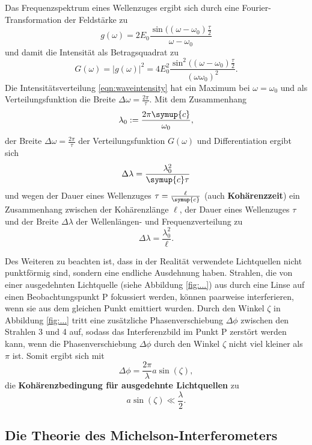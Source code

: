 Das Frequenzspektrum eines Wellenzuges ergibt sich durch eine Fourier-Transformation der 
Feldstärke zu 
\begin{equation}
	g(\omega) = 2E_0 \frac{\sin((\omega-\omega_0)\frac{\tau}{2}}{\omega-\omega_0}
\end{equation}
und damit die Intensität als Betragsquadrat zu
\begin{equation}
	\label{eqn:waveintensity}
	G(\omega) = |g(\omega)|^2 = 4E_0^2 \frac{\sin^2((\omega-\omega_0)\frac{\tau}{2}}{(\omega \omega_0)^2} \mathrm{.}
\end{equation}
Die Intensitätsverteilung \eqref{eqn:waveintensity} hat ein Maximum bei $\omega=\omega_0$ und 
als Verteilungsfunktion die Breite $\Delta \omega = \frac{2\pi}{\tau}$.
Mit dem Zusammenhang 
\begin{equation}
	\lambda_0 := \frac{2\pi \symup{c}}{\omega_0} \mathrm{,}
\end{equation}
der Breite $\Delta \omega = \frac{2\pi}{\tau}$ der Verteilungsfunktion $G(\omega)$ und 
Differentiation ergibt sich
\begin{equation}
	\Delta \lambda = \frac{\lambda_0^2}{\symup{c}\tau}
\end{equation}
und wegen der Dauer eines Wellenzuges $\tau = \frac{\ell}{\symup{c}}$ 
(auch \textbf{Kohärenzzeit}) ein Zusammenhang zwischen der Kohärenzlänge $\ell$, der Dauer
eines Wellenzuges $\tau$ und der Breite $\Delta \lambda$ der Wellenlängen- und Frequenzverteilung zu 
\begin{equation}
	\Delta \lambda = \frac{\lambda_0^2}{\ell} \mathrm{.}
\end{equation}

Des Weiteren zu beachten ist, dass in der Realität verwendete Lichtquellen nicht punktförmig 
sind, sondern eine endliche Ausdehnung haben. Strahlen, die von einer ausgedehnten Lichtquelle 
(siehe Abbildung \ref{fig:...}) aus durch eine Linse auf einen Beobachtungspunkt P fokussiert 
werden, können paarweise interferieren, wenn sie aus dem gleichen Punkt emittiert wurden. 
Durch den Winkel $\zeta$ in Abbildung \ref{fig:...} tritt eine zusätzliche Phasenverschiebung 
$\Delta \phi$ zwischen den Strahlen 3 und 4 auf, sodass das Interferenzbild im Punkt P 
zerstört werden kann, wenn die Phasenverschiebung $\Delta \phi$ durch den Winkel $\zeta$ nicht 
viel kleiner als $\pi$ ist.
Somit ergibt sich mit 
\begin{equation}
	\Delta \phi = \frac{2\pi}{\lambda} a \sin(\zeta) \mathrm{,}
\end{equation}
die \textbf{Kohärenzbedingung für ausgedehnte Lichtquellen} zu 
\begin{equation}
	a \sin(\zeta) \ll \frac{\lambda}{2} \mathrm{.}
\end{equation}


\subsection{Die Theorie des Michelson-Interferometers}










\cite{Anleitung}
